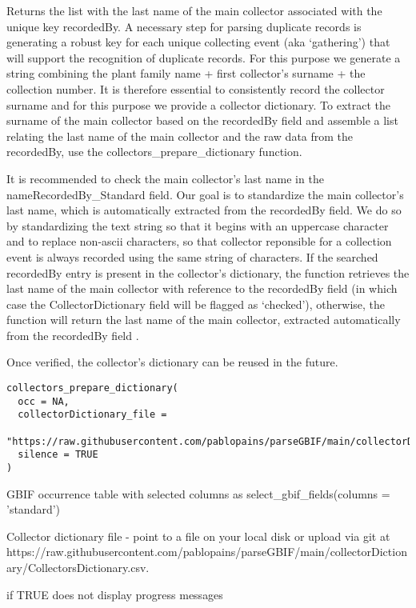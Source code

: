 \documentclass[a4paper]{book}
\begin{document}
\begin{Description}
Returns the list with the last name of the main collector associated with the unique key recordedBy.
A necessary step for parsing duplicate records is generating a robust key for each unique collecting event
(aka ‘gathering’) that will support the recognition of duplicate records. For this purpose we generate a string
combining the plant family name +  first collector’s surname +  the collection number.
It is therefore essential to consistently record the collector surname and for this purpose we provide a collector
dictionary. To extract the surname of the main collector based on the recordedBy field and assemble a list relating
the last name of the main collector and the raw data from the recordedBy, use the collectors\_prepare\_dictionary function.

It is recommended to check the main collector’s last name in the nameRecordedBy\_Standard field.
Our goal is to standardize the main collector’s last name, which is automatically extracted from the recordedBy field.
We do so by standardizing the text string so that it begins with an uppercase character and to replace non-ascii
characters, so that collector reponsible for a collection event is always recorded using  the same string of characters.
If the searched recordedBy entry is present in the collector’s dictionary, the function retrieves the last name
of the main collector with reference to the recordedBy field (in which case the CollectorDictionary field will be
flagged as ‘checked’), otherwise, the function will return the last name of the main collector, extracted
automatically from the recordedBy field .

Once verified, the collector’s dictionary can be reused in the future.
\end{Description}
%
\begin{Usage}
\begin{verbatim}
collectors_prepare_dictionary(
  occ = NA,
  collectorDictionary_file =
    "https://raw.githubusercontent.com/pablopains/parseGBIF/main/collectorDictionary/CollectorsDictionary.csv",
  silence = TRUE
)
\end{verbatim}
\end{Usage}
%
\begin{Arguments}
\begin{ldescription}
\item[\code{occ}] GBIF occurrence table with selected columns as select\_gbif\_fields(columns = 'standard')

\item[\code{collectorDictionary\_file}] Collector dictionary file - point to a file on your local disk or upload via git at https://raw.githubusercontent.com/pablopains/parseGBIF/main/collectorDictionary/CollectorsDictionary.csv.

\item[\code{silence}] if TRUE does not display progress messages
\end{ldescription}
\end{Arguments}
\end{document}
